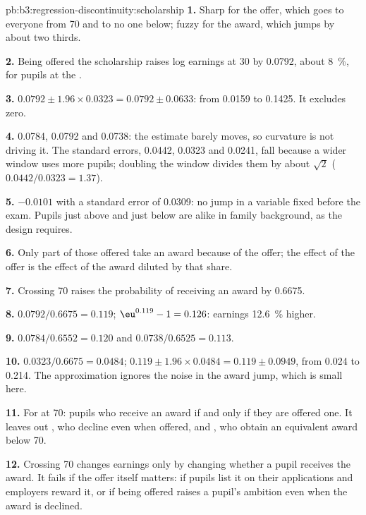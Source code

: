 \begin{solution}{pb:b3:regression-discontinuity:scholarship}
\textbf{1.} Sharp for the offer, which goes to everyone from 70 and to no one
below; fuzzy for the award, which jumps by about two thirds.

\textbf{2.} Being offered the scholarship raises log earnings at 30 by 0.0792,
about 8~\%, for pupils at the .

\textbf{3.} $0.0792 \pm 1.96 \times 0.0323 = 0.0792 \pm 0.0633$: from 0.0159 to
0.1425. It excludes zero.

\textbf{4.} 0.0784, 0.0792 and 0.0738: the estimate barely moves, so curvature
is not driving it. The standard errors, 0.0442, 0.0323 and 0.0241, fall because a
wider window uses more pupils; doubling the window divides them by about
$\sqrt 2$ ($0.0442/0.0323 = 1.37$).

\textbf{5.} $-0.0101$ with a standard error of 0.0309: no jump in a variable
fixed before the exam. Pupils just above and just below are alike in family
background, as the design requires.

\textbf{6.} Only part of those offered take an award because of the offer; the
effect of the offer is the effect of the award diluted by that share.

\textbf{7.} Crossing 70 raises the probability of receiving an award by 0.6675.

\textbf{8.} $0.0792/0.6675 = 0.119$; $\eu^{0.119} - 1 = 0.126$: earnings 12.6~\%
higher.

\textbf{9.} $0.0784/0.6552 = 0.120$ and $0.0738/0.6525 = 0.113$.

\textbf{10.} $0.0323/0.6675 = 0.0484$; $0.119 \pm 1.96 \times 0.0484 = 0.119 \pm
0.0949$, from 0.024 to 0.214. The approximation ignores the noise in the
award jump, which is small here.

\textbf{11.} For  at 70: pupils who receive an award if and only if
they are offered one. It leaves out , who decline even when
offered, and , who obtain an equivalent award below 70.

\textbf{12.} Crossing 70 changes earnings only by changing whether a pupil
receives the award. It fails if the offer itself matters: if pupils list it on
their applications and employers reward it, or if being offered raises a
pupil's ambition even when the award is declined.


\end{solution}
